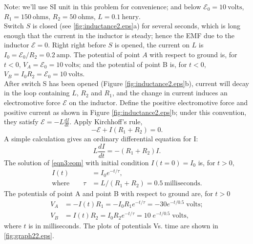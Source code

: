 \documentclass[solutions]{esg8022pset}
\begin{document}
  Note: we'll use SI unit in this problem for convenience; and below
  ${\mathcal{E}}_0=10\:\text{volts}$, $R_1=150\:\text{ohms}$, $R_2=50\:\text{ohms}$,
  $L=0.1\:\text{henry}$.\\

  Switch $S$ is closed (see \autoref{fig:inductance2.eps}a) for several
  seconds, which is long enough that the current in the inductor is
  steady; hence the EMF due to the inductor ${\mathcal{E}}=0$.  Right
  right before $S$ is opened, the current on $L$ is $I_0 =
  {\mathcal{E}}_0/R_2 = 0.2\:\text{amp}$.  The potential of point $A$ with
  respect to ground is, for $t<0$, $V_A = {\mathcal{E}}_0 = 10\:\text{volts}$;
  and the potential of point B is, for $t<0$, $V_B=I_0 R_2=
  {\mathcal{E}}_0=10\:\text{volts}$.\\

  After switch S has been opened (Figure \ref{fig:inductance2.eps}b),
  current will decay in the loop containing $L$, $R_2$ and $R_1$, and
  the change in current induces an electromotive force $\mathcal{E}$ on
  the inductor.  Define the positive electromotive force and positive
  current as shown in Figure \ref{fig:inductance2.eps}b; under this
  convention, they satisfy ${\mathcal{E}}=-L\frac{dI}{dt}$.  Apply
  Kirchhoff's rule,
  \begin{equation}
  -{\mathcal{E}}+I(R_1+R_2)=0.
  \end{equation}
  A simple calculation gives an ordinary differential equation for I:
  \begin{equation}\label{eqn3:eom}
  L\frac{dI}{dt}=-(R_1+R_2)I.
  \end{equation}
  The solution of \autoref{eqn3:eom} with initial condition
  $I(t=0)=I_0$ is, for $t>0$,
  \begin{align}
  I(t) & = I_0 e^{-t/\tau},\\
  \text{where}\qquad \tau & = L/(R_1+R_2)=0.5\: \text{milliseconds}.
  \end{align}
  The potentials of point A and point B with respect to ground are, for $t>0$
  \begin{align}
  V_A & = -I(t)R_1=-I_0 R_1 e^{-t/\tau}= -30e^{-t/0.5}\;\text{volts};\\
  V_B & = I(t)R_2=I_0 R_2 e^{-t/\tau}= 10\;e^{-t/0.5}\;\text{volts},
  \end{align}
  where $t$ is in milliseconds.  The plots of potentials Vs. time are
  shown in \autoref{fig:graph22.eps}.
\end{document}

